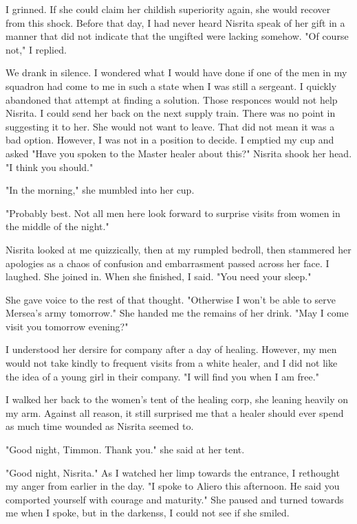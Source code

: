 \documentclass{article}
\begin{document}
I grinned. If she could claim her childish superiority again, she would recover from this shock. Before that day, I had never heard Nisrita speak of her gift in a manner that did not indicate that the ungifted were lacking somehow. "Of course not," I replied.

We drank in silence. I wondered what I would have done if one of the men in my squadron had come to me in such a state when I was still a sergeant. I quickly abandoned that attempt at finding a solution. Those responces would not help Nisrita. I could send her back on the next supply train. There was no point in suggesting it to her. She would not want to leave. That did not mean it was a bad option. However, I was not in a position to decide. I emptied my cup and asked "Have you spoken to the Master healer about this?" Nisrita shook her head. "I think you should."

"In the morning," she mumbled into her cup.

"Probably best. Not all men here look forward to surprise visits from women in the middle of the night." 

Nisrita looked at me quizzically, then at my rumpled bedroll, then stammered her apologies as a chaos of confusion and embarrasment passed across her face. I laughed. She joined in. When she finished, I said. "You need your sleep."

She gave voice to the rest of that thought. "Otherwise I won't be able to serve Mersea's army tomorrow." She handed me the remains of her drink. "May I come visit you tomorrow evening?"

I understood her dersire for company after a day of healing. However, my men would not take kindly to frequent visits from a white healer, and I did not like the idea of a young girl in their company. "I will find you when I am free."

I walked her back to the women's tent of the healing corp, she leaning heavily on my arm. Against all reason, it still surprised me that a healer should ever spend as much time wounded as Nisrita seemed to. 

"Good night, Timmon. Thank you." she said at her tent.

"Good night, Nisrita." As I watched her limp towards the entrance, I rethought my anger from earlier in the day. "I spoke to Aliero this afternoon. He said you comported yourself with courage and maturity." She paused and turned towards me when I spoke, but in the darkenss, I could not see if she smiled. 
\end{document}
